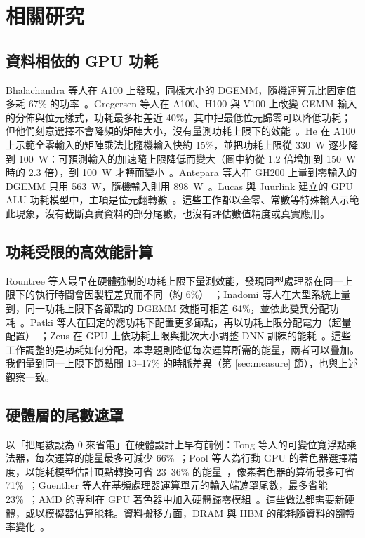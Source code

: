 \chapter{相關研究}\label{ch:related}

\section{資料相依的 GPU 功耗}\label{sec:rw-power}

Bhalachandra 等人在 A100 上發現，同樣大小的 DGEMM，隨機運算元比固定值多耗 67\% 的功率~\cite{Bhalachandra2022}。Gregersen 等人在 A100、H100 與 V100 上改變 GEMM 輸入的分佈與位元樣式，功耗最多相差近 40\%，其中把最低位元歸零可以降低功耗；但他們刻意選擇不會降頻的矩陣大小，沒有量測功耗上限下的效能~\cite{Gregersen2024}。He 在 A100 上示範全零輸入的矩陣乘法比隨機輸入快約 15\%，並把功耗上限從 330~W 逐步降到 100~W：可預測輸入的加速隨上限降低而變大（圖中約從 1.2 倍增加到 150~W 時的 2.3 倍），到 100~W 才轉而變小~\cite{He2024}。Antepara 等人在 GH200 上量到零輸入的 DGEMM 只用 563~W，隨機輸入則用 898~W~\cite{Antepara2025}。Lucas 與 Juurlink 建立的 GPU ALU 功耗模型中，主項是位元翻轉數~\cite{Lucas2016}。這些工作都以全零、常數等特殊輸入示範此現象，沒有截斷真實資料的部分尾數，也沒有評估數值精度或真實應用。

\section{功耗受限的高效能計算}\label{sec:rw-capped}

Rountree 等人最早在硬體強制的功耗上限下量測效能，發現同型處理器在同一上限下的執行時間會因製程差異而不同（約 6\%）~\cite{Rountree2012}；Inadomi 等人在大型系統上量到，同一功耗上限下各節點的 DGEMM 效能可相差 64\%，並依此變異分配功耗~\cite{Inadomi2015}。Patki 等人在固定的總功耗下配置更多節點，再以功耗上限分配電力（超量配置）~\cite{Patki2013}；Zeus 在 GPU 上依功耗上限與批次大小調整 DNN 訓練的能耗~\cite{Zeus2023}。這些工作調整的是功耗如何分配，本專題則降低每次運算所需的能量，兩者可以疊加。我們量到同一上限下節點間 13–17\% 的時脈差異（第 \ref{sec:measure} 節），也與上述觀察一致。

\section{硬體層的尾數遮罩}\label{sec:rw-hw}

以「把尾數設為 0 來省電」在硬體設計上早有前例：Tong 等人的可變位寬浮點乘法器，每次運算的能量最多可減少 66\%~\cite{Tong2000}；Pool 等人為行動 GPU 的著色器選擇精度，以能耗模型估計頂點轉換可省 23–36\% 的能量~\cite{Pool2008}，像素著色器的算術最多可省 71\%~\cite{Pool2011}；Guenther 等人在基頻處理器運算單元的輸入端遮罩尾數，最多省能 23\%~\cite{Guenther2016}；AMD 的專利在 GPU 著色器中加入硬體歸零模組~\cite{AMD2022}。這些做法都需要新硬體，或以模擬器估算能耗。資料搬移方面，DRAM 與 HBM 的能耗隨資料的翻轉率變化~\cite{Chatterjee2017,OConnor2017,Ghose2018}。

